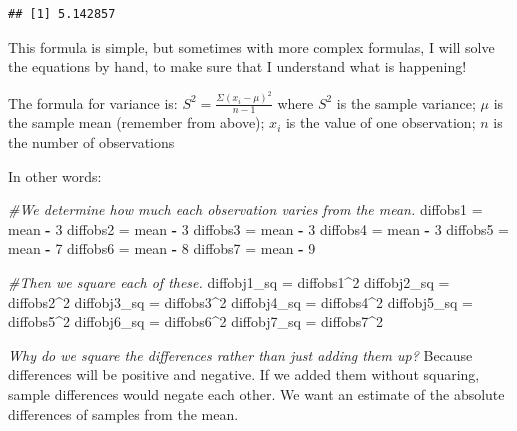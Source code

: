 \documentclass[
]{book}
\newenvironment{Shaded}{\begin{snugshade}}{\end{snugshade}}
\newcommand{\CommentTok}[1]{\textcolor[rgb]{0.56,0.35,0.01}{\textit{#1}}}
\newcommand{\DecValTok}[1]{\textcolor[rgb]{0.00,0.00,0.81}{#1}}
\newcommand{\NormalTok}[1]{#1}
\newcommand{\OtherTok}[1]{\textcolor[rgb]{0.56,0.35,0.01}{#1}}
\newcommand{\SpecialCharTok}[1]{\textcolor[rgb]{0.81,0.36,0.00}{\textbf{#1}}}
\begin{document}
\begin{verbatim}
## [1] 5.142857
\end{verbatim}

This formula is simple, but sometimes with more complex formulas, I will solve the equations by hand, to make sure that I understand what is happening!

The formula for variance is: \(S^{2} = \frac{\Sigma(x_i - \mu)^{2}}{n - 1}\)
where \(S^{2}\) is the sample variance;
\(\mu\) is the sample mean (remember from above);
\(x_{i}\) is the value of one observation;
\(n\) is the number of observations

In other words:

\begin{Shaded}
\begin{Highlighting}[]
\CommentTok{\#We determine how much each observation varies from the mean.}
\NormalTok{diffobs1 }\OtherTok{=}\NormalTok{ mean }\SpecialCharTok{{-}} \DecValTok{3}
\NormalTok{diffobs2 }\OtherTok{=}\NormalTok{ mean }\SpecialCharTok{{-}} \DecValTok{3}
\NormalTok{diffobs3 }\OtherTok{=}\NormalTok{ mean }\SpecialCharTok{{-}} \DecValTok{3}
\NormalTok{diffobs4 }\OtherTok{=}\NormalTok{ mean }\SpecialCharTok{{-}} \DecValTok{3}
\NormalTok{diffobs5 }\OtherTok{=}\NormalTok{ mean }\SpecialCharTok{{-}} \DecValTok{7} 
\NormalTok{diffobs6 }\OtherTok{=}\NormalTok{ mean }\SpecialCharTok{{-}} \DecValTok{8}
\NormalTok{diffobs7 }\OtherTok{=}\NormalTok{ mean }\SpecialCharTok{{-}} \DecValTok{9} 

\CommentTok{\#Then we square each of these. }
\NormalTok{diffobj1\_sq }\OtherTok{=}\NormalTok{ diffobs1}\SpecialCharTok{\^{}}\DecValTok{2}
\NormalTok{diffobj2\_sq }\OtherTok{=}\NormalTok{ diffobs2}\SpecialCharTok{\^{}}\DecValTok{2}
\NormalTok{diffobj3\_sq }\OtherTok{=}\NormalTok{ diffobs3}\SpecialCharTok{\^{}}\DecValTok{2}
\NormalTok{diffobj4\_sq }\OtherTok{=}\NormalTok{ diffobs4}\SpecialCharTok{\^{}}\DecValTok{2}
\NormalTok{diffobj5\_sq }\OtherTok{=}\NormalTok{ diffobs5}\SpecialCharTok{\^{}}\DecValTok{2}
\NormalTok{diffobj6\_sq }\OtherTok{=}\NormalTok{ diffobs6}\SpecialCharTok{\^{}}\DecValTok{2}
\NormalTok{diffobj7\_sq }\OtherTok{=}\NormalTok{ diffobs7}\SpecialCharTok{\^{}}\DecValTok{2}
\end{Highlighting}
\end{Shaded}

\emph{Why do we square the differences rather than just adding them up?}
Because differences will be positive and negative. If we added them without squaring, sample differences would negate each other. We want an estimate of the absolute differences of samples from the mean.
\end{document}
